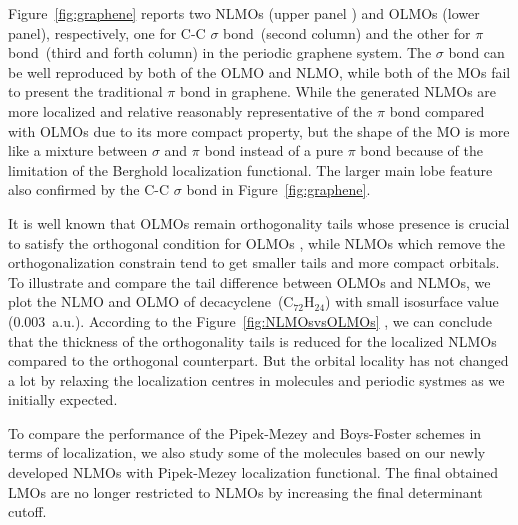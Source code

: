 \documentclass[aps,prl,reprint,amsmath,amssymb]{revtex4-1}
\begin{document}
Figure~\ref{fig:graphene} reports two NLMOs (upper panel ) and OLMOs (lower panel), respectively, one for C-C $\sigma$ bond~(second column) and the other for $\pi$ bond~(third and forth column) in the periodic graphene system.
The $\sigma$ bond can be well reproduced by both of the OLMO and NLMO, while both of the MOs fail to present the traditional $\pi$ bond in graphene.
While the generated NLMOs are more localized and  relative reasonably representative of the $\pi$ bond compared with OLMOs due to its more compact property, but the shape of the MO is more like a mixture between $\sigma$ and $\pi$ bond instead of a pure $\pi$ bond because of the limitation of the Berghold localization functional.
The larger main lobe feature also confirmed by the C-C $\sigma$ bond in Figure~\ref{fig:graphene}.

It is well known that OLMOs remain orthogonality tails whose presence is crucial to satisfy the orthogonal condition for OLMOs , while NLMOs which remove the orthogonalization constrain tend to get smaller tails and more compact orbitals. 
To illustrate and compare the tail difference between OLMOs and NLMOs, we plot the NLMO and OLMO of decacyclene~(C$_{72}$H$_{24}$) with small isosurface value (0.003~a.u.).
According to the Figure~\ref{fig:NLMOsvsOLMOs} , we can conclude that the thickness of the orthogonality tails is reduced for the localized NLMOs compared to the orthogonal counterpart.
But the orbital locality has not changed a lot by relaxing the localization centres in molecules and periodic systmes as we initially expected.

To compare the performance of the Pipek-Mezey and Boys-Foster schemes in terms of localization, we also study some of the molecules based on our newly developed NLMOs with Pipek-Mezey localization functional.
The final obtained LMOs are no longer restricted to NLMOs by increasing the final determinant cutoff.
\end{document}
